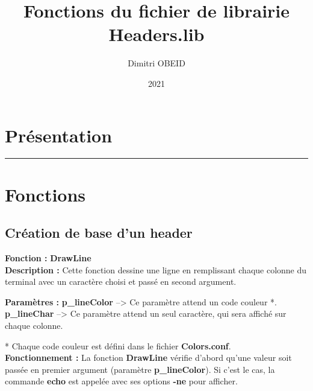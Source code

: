 \documentclass[a4paper,10pt]{article}
\title{Fonctions du fichier de librairie Headers.lib}
\author{Dimitri OBEID}
\date{2021}
\begin{document}
 \maketitle
 \tableofcontents
 \newpage

\color{red}
\section{Présentation}\color{white}

\color{red}\par\noindent\rule{\textwidth}{0.4pt}\color{white}

\color{red}
\section{Fonctions}\color{white}

\color{green}
\subsection{Création de base d'un header}\color{white}

\textbf{Fonction : }\color{mauve}\textbf{DrawLine}\color{white}\\[1\baselineskip]
\textbf{Description :}\linebreak
Cette fonction dessine une ligne en remplissant chaque colonne du terminal avec un caractère choisi et passé en second argument.\linebreak

\textbf{Paramètres :}\linebreak
\color{orange}\textbf{p\_lineColor }\color{white} --> Ce paramètre attend un code couleur *.\linebreak
\color{orange}\textbf{p\_lineChar }\color{white} --> Ce paramètre attend un seul caractère, qui sera affiché sur chaque colonne.\linebreak

* Chaque code couleur est défini dans le fichier \color{lime}\textbf{Colors.conf}\color{white}.\\[1\baselineskip]

\textbf{Fonctionnement :}\linebreak
La fonction \color{mauve}\textbf{DrawLine }\color{white} vérifie d'abord qu'une valeur soit passée en premier argument (paramètre \color{orange}\textbf{p\_lineColor}\color{white}). Si c'est le cas, la commande \color{gray}\textbf{echo }\color{white} est appelée avec ses options \color{gray}\textbf{-ne }\color{white} pour afficher.\\[1\baselineskip]
\end{document}
